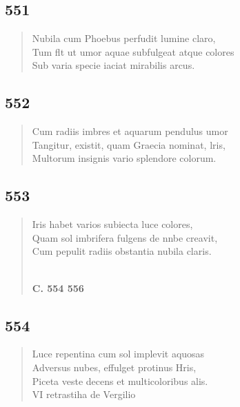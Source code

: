 \documentclass[11pt, a4paper]{report}
\begin{document}
            \subsection*{551}
      \begin{verse}
      Nubila cum Phoebus perfudit lumine claro, \\ Tum flt ut umor aquae subfulgeat atque colores \\ Sub varia specie iaciat mirabilis arcus. \\ 
      \end{verse}
  
            \subsection*{552}
      \begin{verse}
      Cum radiis imbres et aquarum pendulus umor \\ Tangitur, existit, quam Graecia nominat, lris, \\ Multorum insignis vario splendore colorum. \\ 
      \end{verse}
  
            \subsection*{553}
      \begin{verse}
      Iris habet varios subiecta luce colores, \\ Quam sol imbrifera fulgens de nnbe creavit, \\ Cum pepulit radiis obstantia nubila claris. \\ 
        ﻿\pagebreak 
    \begin{center} \textbf{C. 554 556} \end{center} \marginpar{[72]} 
      \end{verse}
  
            \subsection*{554}
      \begin{verse}
      Luce repentina cum sol implevit aquosas \\ Adversus nubes, effulget protinus Hris, \\ Piceta veste decens et multicoloribus alis. \\ VI retrastiha de Vergilio \\ 
      \end{verse}
  
\end{document}

